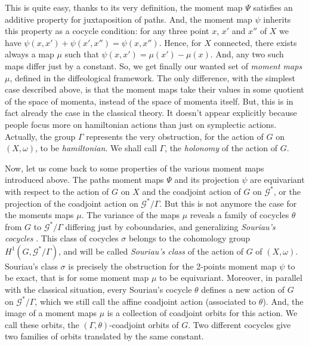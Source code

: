 \documentclass[10pt,reqno,twoside]{amsart}
\newcommand{\cG}{\mathcal{G}}
\theoremstyle{plain}
\theoremstyle{definition}
\begin{document}
  This is quite easy,
  thanks to its very definition,
  the moment map $\Psi$ satisfies an additive property for juxtaposition of paths.
  And,
  the moment map $\psi$ inherits this property as a cocycle condition:
  for any three point $x$, $x'$ and $x''$ of $X$ we have $\psi(x,x') + \psi(x',x'') = \psi(x,x'')$.
  Hence,
  for $X$ connected,
  there exists always a map $\mu$ such that $\psi(x,x') = \mu(x') - \mu(x)$.
  And,
  any two such maps differ just by a constant.
  So,
  we get finally our wanted set of {\em moment maps\/} $\mu$,
  defined in the diffeological framework.
  The only difference,
  with the simplest case described above,
  is that the moment maps take their values in some quotient of the space of momenta,
  instead of the space of momenta itself.
  But,
  this is in fact already the case in the classical theory.
  It doesn't appear explicitly because people focus more on hamiltonian actions than just on symplectic actions.
  Actually,
  the group $\Gamma$ represents the very obstruction,
  for the action of $G$ on $(X,\omega)$,
  to be {\em hamiltonian}.
  We shall call $\Gamma$,
  the {\em holonomy} of the action of $G$.
  
  Now,
  let us come back to some properties of the various moment maps introduced above.
  The paths moment maps $\Psi$ and its projection $\psi$ are equivariant with respect to the action of $G$ on $X$ and the coadjoint action of $G$ on $\cG^*$,
  or the projection of the coadjoint action on $\cG^*\!/\Gamma$.
  But this is not anymore the case for the moments maps $\mu$.
  The variance of the maps $\mu$ reveals a family of cocycles $\theta$ from $G$ to $\cG^*\!/\Gamma$ differing just by coboundaries,
  and generalizing {\em Souriau's cocycles\/} \cite{Sou70}.
  This class of cocycles $\sigma$ belongs to the cohomology group $H^1(G, \cG^*\!/\Gamma)$,
  and will be called {\em Souriau's class} of the action of $G$ of $(X, \omega)$.
  Souriau's class $\sigma$ is precisely the obstruction for the 2-points moment map $\psi$ to be exact,
  that is for some moment map $\mu$ to be equivariant.
  Moreover,
  in parallel with the classical situation,
  every Souriau's cocycle $\theta$ defines a new action of $G$ on $\cG^*\!/\Gamma$,
  which we still call the affine coadjoint action (associated to $\theta$).
  And,
  the image of a moment maps $\mu$ is a collection of coadjoint orbits for this action.
  We call these orbits,
  the $(\Gamma,\theta)$-coadjoint orbits of $G$.
  Two different cocycles give two families of orbits translated by the same constant.
  
\end{document}
